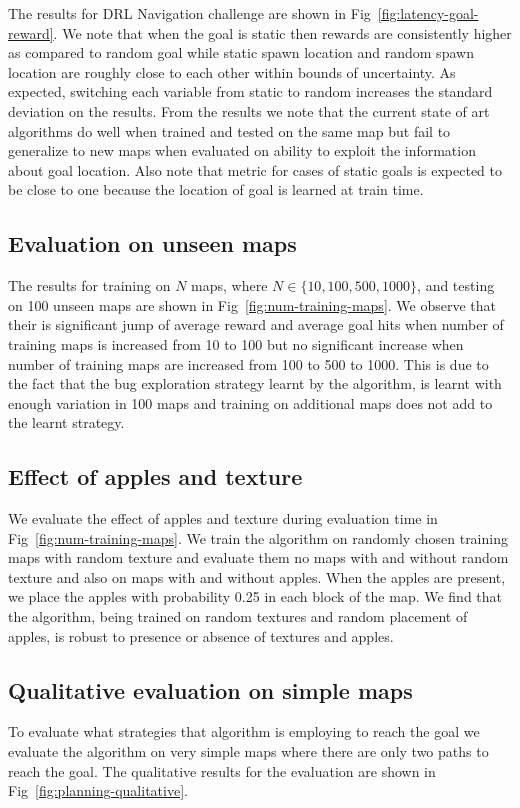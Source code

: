The results for DRL Navigation challenge are shown in Fig~\ref{fig:latency-goal-reward}.
We note that when the goal is static then rewards are consistently higher as compared to random goal while static spawn location and random spawn location are roughly close to each other within bounds of uncertainty. As expected, switching each variable from static to random increases the standard deviation on the results.
  From the \LatencyOneGtOne{} results we note that the current state of art algorithms do well when trained and tested on the same map but fail to generalize to new maps when evaluated on ability to exploit the information about goal location.
  Also note that \LatencyOneGtOne{} metric for cases of static goals is expected to be close to one because the location of goal is learned at train time.

\subsection{Evaluation on unseen maps}
The results for training on $N$ maps, where $N \in \{10, 100, 500, 1000\}$, and testing on 100 unseen maps are shown in Fig~\ref{fig:num-training-maps}. We observe that their is significant jump of average reward and average goal hits when number of training maps is increased from 10 to 100 but no significant increase when number of training maps are increased from 100 to 500 to 1000.
This is due to the fact that the bug exploration strategy learnt by the algorithm,
is learnt with enough variation in 100 maps and training on additional maps does not add to the learnt strategy.

\subsection{Effect of apples and texture}
We evaluate the effect of apples and texture during evaluation time in Fig~\ref{fig:num-training-maps}.
We train the algorithm on randomly chosen training maps with random texture and evaluate them no maps with and without random texture and also on maps with and without apples. When the apples are present, we place the apples with probability 0.25 in each block of the map.
We find that the algorithm, being trained on random textures and random placement of apples, is robust to presence or absence of textures and apples.


\subsection{Qualitative evaluation on simple maps}
To evaluate what strategies that algorithm is employing to reach the
goal we evaluate the algorithm on very simple maps where there are only two
paths to reach the goal. The qualitative results for the evaluation are shown
in Fig~\ref{fig:planning-qualitative}.

